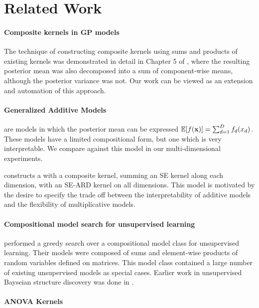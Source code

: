 \documentclass[twoside]{article}
\begin{document}

\section{Related Work}

\paragraph{Composite kernels in GP models} The technique of constructing composite kernels using sums and products of existing kernels was demonstrated in detail in Chapter 5 of \cite{rasmussen38gaussian}, where the resulting posterior mean was also decomposed into a sum of component-wise means, although the posterior variance was not.  Our work can be viewed as an extension and automation of this approach.

\paragraph{Generalized Additive Models} \cite{hastie1990generalized} are models in which the posterior mean can be expressed $\mathbb{E}[f({\bf{x}})] = \sum_{d=1}^D f_d(x_d)$. These models have a limited compositional form, but one which is very interpretable.  We compare against this model in our multi-dimensional experiments.

\cite{plate1999accuracy} constructs a \gp{} with a composite kernel, summing an SE kernel along each dimension, with an SE-ARD kernel on all dimensions.  This model is motivated by the desire to specify the trade off between the interpretability of additive models and the flexibility of multiplicative models.

\paragraph{Compositional model search for unsupervised learning} \cite{grosse2012exploiting} performed a greedy search over a compositional model class for unsupervised learning.  Their models were composed of sums and element-wise products of random variables defined on matrices.  This model class contained a large number of existing unsupervised models as special cases.  Earlier work in unsupervised Bayseian structure discovery was done in \cite{kemp2008discovery}.

\paragraph{ANOVA Kernels}
\end{document}
